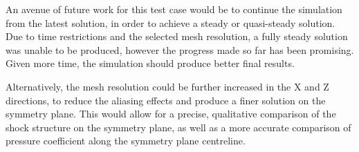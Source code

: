An avenue of future work for this test case would be to continue the simulation from the latest solution, in order to achieve a steady or quasi-steady solution. Due to time restrictions and the selected mesh resolution, a fully steady solution was unable to be produced, however the progress made so far has been promising. Given more time, the simulation should produce better final results.

Alternatively, the mesh resolution could be further increased in the X and Z directions, to reduce the aliasing effects and produce a finer solution on the symmetry plane. This would allow for a precise, qualitative comparison of the shock structure on the symmetry plane, as well as a more accurate comparison of pressure coefficient along the symmetry plane centreline.